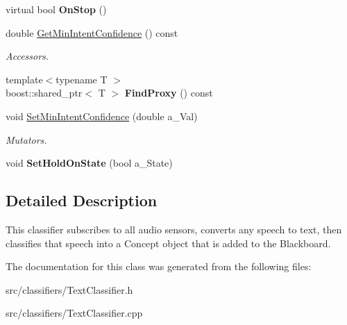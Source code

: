 \begin{DoxyCompactItemize}
virtual bool {\bfseries On\+Stop} ()
\item 
\mbox{\label{class_text_classifier_abf71fa10a6b362886f5d8f4f573c0b5a}} 
double \hyperlink{class_text_classifier_abf71fa10a6b362886f5d8f4f573c0b5a}{Get\+Min\+Intent\+Confidence} () const
\begin{DoxyCompactList}\small\item\em Accessors. \end{DoxyCompactList}\item 
\mbox{\label{class_text_classifier_a0280f4c2fdb7eeea267cc95fb3642a35}} 
{\footnotesize template$<$typename T $>$ }\\boost\+::shared\+\_\+ptr$<$ T $>$ {\bfseries Find\+Proxy} () const
\item 
\mbox{\label{class_text_classifier_a1e1072e00bc53adb09ca65b6564b0d47}} 
void \hyperlink{class_text_classifier_a1e1072e00bc53adb09ca65b6564b0d47}{Set\+Min\+Intent\+Confidence} (double a\+\_\+\+Val)
\begin{DoxyCompactList}\small\item\em Mutators. \end{DoxyCompactList}\item 
\mbox{\label{class_text_classifier_a887ab4a8a3046098f52f42a4a0cf6aea}} 
void {\bfseries Set\+Hold\+On\+State} (bool a\+\_\+\+State)
\end{DoxyCompactItemize}


\subsection{Detailed Description}
This classifier subscribes to all audio sensors, converts any speech to text, then classifies that speech into a Concept object that is added to the Blackboard. 

The documentation for this class was generated from the following files\+:\begin{DoxyCompactItemize}
\item 
src/classifiers/Text\+Classifier.\+h\item 
src/classifiers/Text\+Classifier.\+cpp\end{DoxyCompactItemize}

